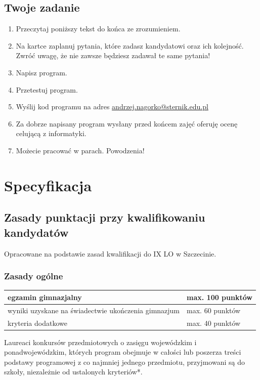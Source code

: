\documentclass[a4paper,12pt]{scrartcl}
\newcounter{zad}
\begin{document}
\subsection*{Twoje zadanie}

\begin{enumerate}
\item Przeczytaj poniższy tekst {\sc do końca} ze zrozumieniem.
\item {\sc Na kartce} zaplanuj pytania, które zadasz kandydatowi oraz ich kolejność. 
  Zwróć uwagę, że nie zawsze będziesz zadawał te same pytania!
\item Napisz program.
\item {\sc Przetestuj} program.
\item Wyślij kod programu na adres \url{andrzej.nagorko@sternik.edu.pl}
\item Za {\sc dobrze} napisany program wysłany {\sc przed końcem zajęć} oferuję ocenę celującą z informatyki.
\item Możecie pracować w parach. Powodzenia!
\end{enumerate}

\section*{Specyfikacja}
\subsection*{Zasady punktacji przy kwalifikowaniu kandydatów}

Opracowane na podstawie zasad kwalifikacji do IX LO w Szczecinie.

\subsubsection*{Zasady ogólne}

\begin{tabular}{|l|l|}
\hline egzamin gimnazjalny & max. 100 punktów \\
\hline wyniki uzyskane na świadectwie ukończenia gimnazjum & max. 60 punktów \\
\hline kryteria dodatkowe & max. 40 punktów \\
\hline
\end{tabular}

\vspace{3mm}
Laureaci konkursów przedmiotowych o zasięgu wojewódzkim i ponadwojewódzkim, których program obejmuje w całości lub poszerza treści podstawy programowej z co najmniej jednego przedmiotu, 
przyjmowani są do szkoły, niezależnie od ustalonych kryteriów*.
\end{document}
